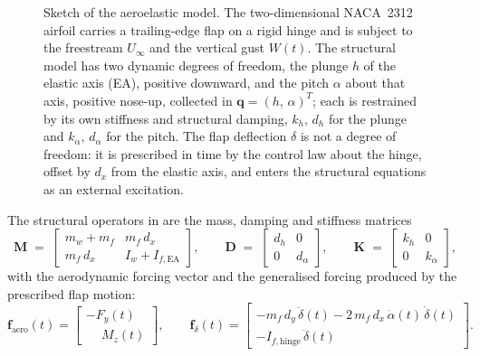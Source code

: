 \begin{figure}[t]
    \centering
    
    \caption{Sketch of the aeroelastic model. The two-dimensional NACA~2312
    airfoil carries a trailing-edge flap on a rigid hinge and is subject to the
    freestream $U_\infty$ and the vertical gust $W(t)$. The structural model has
    two dynamic degrees of freedom, the plunge $h$ of the elastic axis (EA),
    positive downward, and the pitch $\alpha$ about that axis, positive nose-up,
    collected in $\mathbf{q} = (h,\,\alpha)^{T}$; each is restrained by its own
    stiffness and structural damping, $k_h,\,d_h$ for the plunge and
    $k_\alpha,\,d_\alpha$ for the pitch. The flap deflection $\delta$ is not a
    degree of freedom: it is prescribed in time by the control law about the
    hinge, offset by $d_x$ from the elastic axis, and enters the structural
    equations as an external excitation.}
    \label{fig:airfoil_scheme}
\end{figure}

The structural operators in  are the mass, damping and stiffness matrices
\begin{equation}
\mathbf{M} \;=\;
\begin{bmatrix}
m_{w} + m_{f} & m_{f}\,d_{x} \\[0.2em]
m_{f}\,d_{x} & I_{w} + I_{f,\text{EA}}
\end{bmatrix},
\qquad
\mathbf{D} \;=\;
\begin{bmatrix}
d_{h} & 0 \\
0 & d_{\alpha}
\end{bmatrix},
\qquad
\mathbf{K} \;=\;
\begin{bmatrix}
k_{h} & 0 \\
0 & k_{\alpha}
\end{bmatrix},
\label{eq:matrices}
\end{equation}
with the aerodynamic forcing vector and the generalised forcing produced by the prescribed flap motion:
\begin{equation}
\mathbf{f}_{\text{aero}}(t) =
\begin{bmatrix}
- F_{y}(t) \\[0.2em]
\phantom{-}M_{z}(t)
\end{bmatrix},
\qquad
\mathbf{f}_{\delta}(t) =
\begin{bmatrix}
- m_{f}\,d_{y}\,\ddot\delta(t) - 2\,m_{f}\,d_{x}\,\dot\alpha(t)\,\dot\delta(t) \\[0.4em]
- I_{f,\text{hinge}}\,\ddot\delta(t)
\end{bmatrix}.
\label{eq:forcing_vectors}
\end{equation}

